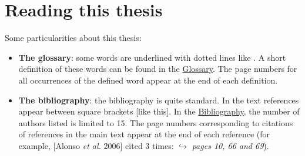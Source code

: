 


\chapter*{Reading this thesis}
Some particularities about this thesis:
\begin{itemize}
\item \textbf{The glossary}: some words are underlined with dotted lines like  . A short definition of these words can be found in the \hyperref[theglossary]{Glossary}. The page numbers for all occurrences of the defined word appear at the end of each definition.
\item \textbf{The bibliography}: the bibliography is quite standard. In the text references appear between square brackets [like this]. In the \hyperref[thebibliograhy]{Bibliography}, the number of authors listed  is limited to 15. The page numbers corresponding to citations of references in the main text appear at the end of each reference (for example, [Alonso \textit{et al.} 2006] cited 3 times: {\footnotesize $\hookrightarrow$ \textit{pages 10, 66 and 69}}).
\end{itemize}



